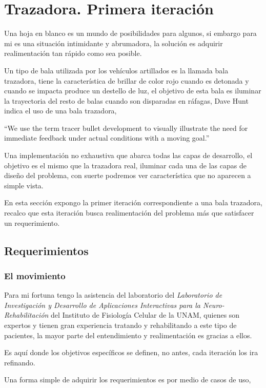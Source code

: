 \chapter{Trazadora. Primera iteración}

Una hoja en blanco es un mundo de posibilidades para algunos, si embargo para mi
es una situación intimidante y abrumadora, la solución es adquirir 
realimentación tan rápido como sea posible.

Un tipo de bala utilizada por los vehículos artillados es la llamada
bala trazadora, tiene la característica de brillar de color rojo cuando es 
detonada y cuando se impacta produce un destello de luz, el objetivo de esta
bala es iluminar la trayectoria del resto de balas cuando son disparadas en 
ráfagas, Dave Hunt indica el uso de una bala trazadora,

``We use the term tracer bullet development to visually illustrate the need for
immediate feedback under actual conditions with a moving goal.''\cite{pragmatic}

Una implementación no exhaustiva que abarca todas las capas de desarrollo,
el objetivo es el mismo que la trazadora real, iluminar cada una de las capas de
diseño del problema, con suerte podremos ver característica que no 
aparecen a simple vista.

En esta sección expongo la primer iteración correspondiente a una bala
trazadora, recalco que esta iteración busca realimentación del problema
más que satisfacer un requerimiento.

\section{Requerimientos}
\subsection{El movimiento}
Para mi fortuna tengo la asistencia del laboratorio del \emph{Laboratorio de 
Investigación y Desarrollo de Aplicaciones Interactivas para la
Neuro-Rehabilitación} del Instituto de Fisiología Celular de la UNAM, quienes
son expertos y tienen gran experiencia tratando y rehabilitando a este tipo 
de pacientes, la mayor parte del entendimiento y realimentación es gracias a
ellos.

Es aquí donde los objetivos específicos se definen, no antes, cada iteración los
ira refinando. 

Una forma simple de adquirir los requerimientos es por medio de casos de uso,

